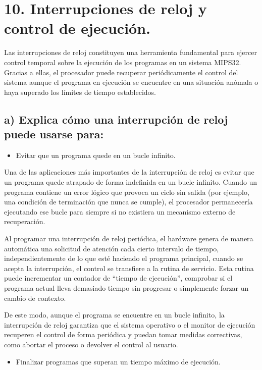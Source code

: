 \documentclass[12pt, letterpaper]{article}
\begin{document}
\section*{10. Interrupciones de reloj y control de ejecución.}

Las interrupciones de reloj constituyen una herramienta fundamental para ejercer control temporal sobre la ejecución de los programas en un sistema MIPS32. Gracias a ellas, el procesador puede recuperar periódicamente el control del sistema aunque el programa en ejecución se encuentre en una situación anómala o haya superado los límites de tiempo establecidos.

\subsection*{a) Explica cómo una interrupción de reloj puede usarse para:}

\begin{itemize}
    \item Evitar que un programa quede en un bucle infinito.
\end{itemize}

Una de las aplicaciones más importantes de la interrupción de reloj es evitar que un programa quede atrapado de forma indefinida en un bucle infinito. Cuando un programa contiene un error lógico que provoca un ciclo sin salida (por ejemplo, una condición de terminación que nunca se cumple), el procesador permanecería ejecutando ese bucle para siempre si no existiera un mecanismo externo de recuperación.

Al programar una interrupción de reloj periódica, el hardware genera de manera automática una solicitud de atención cada cierto intervalo de tiempo, independientemente de lo que esté haciendo el programa principal, cuando se acepta la interrupción, el control se transfiere a la rutina de servicio. Esta rutina puede incrementar un contador de “tiempo de ejecución”, comprobar si el programa actual lleva demasiado tiempo sin progresar o simplemente forzar un cambio de contexto.

De este modo, aunque el programa se encuentre en un bucle infinito, la interrupción de reloj garantiza que el sistema operativo o el monitor de ejecución recuperen el control de forma periódica y puedan tomar medidas correctivas, como abortar el proceso o devolver el control al usuario.

\begin{itemize}
    \item Finalizar programas que superan un tiempo máximo de ejecución.
\end{itemize}
\end{document}
